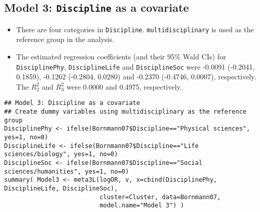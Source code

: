 \documentclass[11pt]{article}
\begin{document}
\subsection{Model 3: \texttt{Discipline} as a covariate}
\label{sec:org6bf6365}
\begin{itemize}
\item There are four categories in \texttt{Discipline}. \texttt{multidisciplinary} is used as the reference group in the analysis.
\item The estimated regression coefficients (and their 95\% Wald CIs) for \texttt{DisciplinePhy}, \texttt{DisciplineLife} and \texttt{DisciplineSoc} were -0.0091 (-0.2041, 0.1859), -0.1262 (-0.2804, 0.0280) and -0.2370 (-0.4746, 0.0007), respectively. The \(R^2_2\) and \(R^2_3\) were 0.0000 and 0.4975, respectively.
\end{itemize}

\begin{verbatim}
## Model 3: Discipline as a covariate
## Create dummy variables using multidisciplinary as the reference group
DisciplinePhy <- ifelse(Bornmann07$Discipline=="Physical sciences", yes=1, no=0)
DisciplineLife <- ifelse(Bornmann07$Discipline=="Life sciences/biology", yes=1, no=0)
DisciplineSoc <- ifelse(Bornmann07$Discipline=="Social sciences/humanities", yes=1, no=0)
summary( Model3 <- meta3L(logOR, v, x=cbind(DisciplinePhy, DisciplineLife, DisciplineSoc), 
                          cluster=Cluster, data=Bornmann07,
                          model.name="Model 3") )
\end{verbatim}
\end{document}
